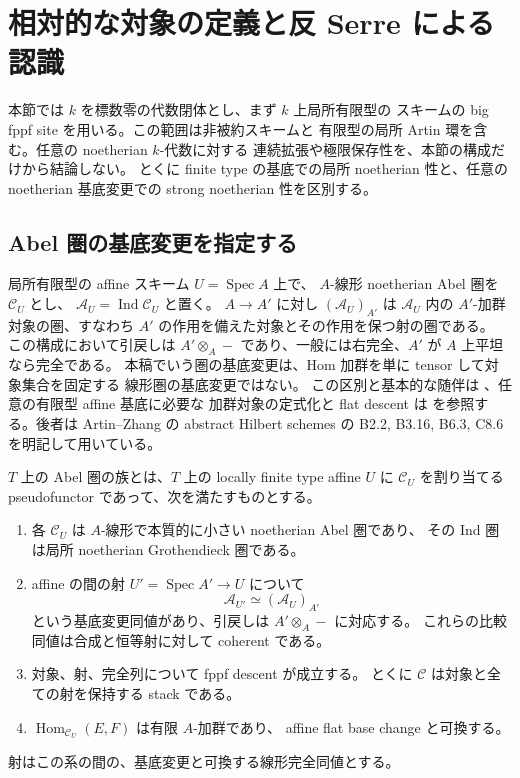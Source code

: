 \section{相対的な対象の定義と反 Serre による認識}
\label{sec:relative-h2-definition}

本節では $k$ を標数零の代数閉体とし、まず $k$ 上局所有限型の
スキームの big fppf site を用いる。この範囲は非被約スキームと
有限型の局所 Artin 環を含む。任意の noetherian $k$-代数に対する
連続拡張や極限保存性を、本節の構成だけから結論しない。
とくに finite type の基底での局所 noetherian 性と、任意の
noetherian 基底変更での strong noetherian 性を区別する。

\subsection{Abel 圏の基底変更を指定する}

局所有限型の affine スキーム $U=\operatorname{Spec}A$ 上で、
$A$-線形 noetherian Abel 圏を $\mathcal C_U$ とし、
$\mathcal A_U=\operatorname{Ind}\mathcal C_U$ と置く。
$A\to A'$ に対し $(\mathcal A_U)_{A'}$ は
$\mathcal A_U$ 内の $A'$-加群対象の圏、すなわち
$A'$ の作用を備えた対象とその作用を保つ射の圏である。
この構成において引戻しは
$A'\otimes_A-$ であり、一般には右完全、$A'$ が $A$ 上平坦なら完全である。
本稿でいう圏の基底変更は、Hom 加群を単に tensor して対象集合を固定する
線形圏の基底変更ではない。
この区別と基本的な随伴は
\cite[\S4]{LowenVanDenBergh2006}、任意の有限型 affine 基底に必要な
加群対象の定式化と flat descent は
\cite[\S7.1, Definition 7.3, Remarks 7.4--7.5]{AHLHExistence}
を参照する。後者は Artin--Zhang の abstract Hilbert schemes の
B2.2, B3.16, B6.3, C8.6 を明記して用いている。

\begin{definition}
\label{def:relative-abelian-system}
$T$ 上の Abel 圏の族とは、$T$ 上の locally finite type affine
$U$ に $\mathcal C_U$ を割り当てる pseudofunctor であって、次を満たすものとする。
\begin{enumerate}
\item 各 $\mathcal C_U$ は $A$-線形で本質的に小さい noetherian Abel 圏であり、
  その Ind 圏は局所 noetherian Grothendieck 圏である。
\item affine の間の射 $U'=\operatorname{Spec}A'\to U$ について
  \[
    \mathcal A_{U'}\simeq(\mathcal A_U)_{A'}
  \]
  という基底変更同値があり、引戻しは $A'\otimes_A-$ に対応する。
  これらの比較同値は合成と恒等射に対して coherent である。
\item 対象、射、完全列について fppf descent が成立する。
  とくに $\mathcal C$ は対象と全ての射を保持する stack である。
\item $\operatorname{Hom}_{\mathcal C_U}(E,F)$ は有限 $A$-加群であり、
  affine flat base change と可換する。
\end{enumerate}
射はこの系の間の、基底変更と可換する線形完全同値とする。
\end{definition}

